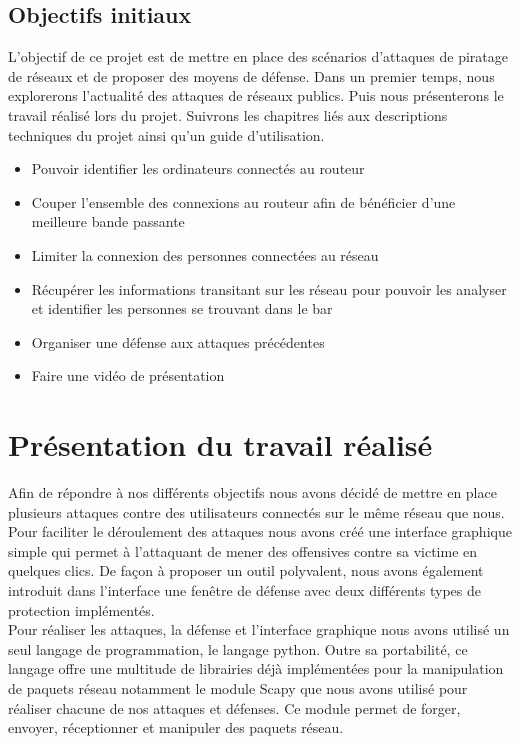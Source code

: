 \documentclass[11pt]{article}
\begin{document}
\subsection{Objectifs initiaux}
L’objectif de ce projet est de mettre en place des scénarios d’attaques de piratage de réseaux et de proposer des moyens de défense. Dans un premier temps, nous explorerons l'actualité des attaques de réseaux publics. Puis nous présenterons le travail réalisé lors du projet. Suivrons les chapitres liés aux descriptions techniques du projet ainsi qu'un guide d'utilisation.

\begin{itemize}
\item Pouvoir identifier les ordinateurs connectés au routeur
\item Couper l’ensemble des connexions au routeur afin de bénéficier d’une meilleure bande passante
\item Limiter la connexion des personnes connectées au réseau
\item Récupérer les informations transitant sur les réseau pour pouvoir les analyser et identifier les personnes se trouvant dans le bar
\item Organiser une défense aux attaques précédentes
\item Faire une vidéo de présentation 
\end{itemize}

\section{Présentation du travail réalisé}
Afin de répondre à nos différents objectifs nous avons décidé de mettre en place plusieurs attaques contre des utilisateurs connectés sur le même réseau que nous. Pour faciliter le déroulement des attaques nous avons créé une interface graphique simple qui permet à l'attaquant de mener des offensives contre sa victime en quelques clics. De façon à proposer un outil polyvalent, nous avons également introduit dans l'interface une fenêtre de défense avec deux différents types de protection implémentés. ~\\

Pour réaliser les attaques, la défense et l'interface graphique nous avons utilisé un seul langage de programmation, le langage python. Outre sa portabilité, ce langage offre une multitude de librairies déjà implémentées pour la manipulation de paquets réseau notamment le module Scapy que nous avons utilisé pour réaliser chacune de nos attaques et défenses. Ce module permet de forger, envoyer, réceptionner et manipuler des paquets réseau.~\\
\end{document}
